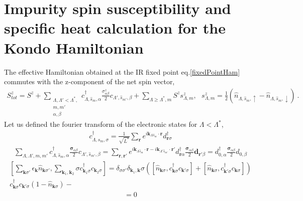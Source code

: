 \documentclass[aps,prx,preprint,groupedaddress]{revtex4-2}
\begin{document}
\section{Impurity spin susceptibility and specific heat calculation for the Kondo Hamiltonian}
The effective Hamiltonian obtained at the IR fixed point eq.\eqref{fixedPointHam} commutes with the z-component of the net spin vector,
\begin{eqnarray}
S^{z}_{tot}=S^{z}+\sum_{\substack{\Lambda,\Lambda'<\Lambda^{*},\\ m,m'\\\alpha,\beta}}c^{\dagger}_{\Lambda,\hat{s}_{m},\alpha}\frac{\sigma_{\alpha\beta}^{z}}{2}c_{\Lambda',\hat{s}_{m'},\beta}+\sum_{\Lambda\geq \Lambda^{*},m}S^{z}s^{z}_{\Lambda,m},~~~ s^{z}_{\Lambda,m}=\frac{1}{2}\left(\hat{n}_{\Lambda,\hat{s}_{m},\uparrow}-\hat{n}_{\Lambda,\hat{s}_{m},\downarrow}\right)~.~~~
\end{eqnarray}
Let us defined the fourier transform of the electronic states for $\Lambda<\Lambda^{*}$,
\begin{eqnarray}
c^{\dagger}_{\Lambda,\hat{s}_{m},\sigma}=\frac{1}{\sqrt{L^{*}}}\sum_{\mathbf{r}}e^{i\mathbf{k}_{\Lambda\hat{s}_{m}}\cdot\mathbf{r}}d^{\dagger}_{\mathbf{r}\sigma}
\end{eqnarray}
\begin{eqnarray}
\sum_{\Lambda,\Lambda',m,m'} c^{\dagger}_{\Lambda,\hat{s}_{m},\alpha}\frac{\boldsymbol{\sigma}_{\alpha\beta}}{2}c_{\Lambda',\hat{s}_{m'},\beta}=\sum_{\mathbf{r},\mathbf{r}'}e^{i\mathbf{k}_{\Lambda\hat{s}_{m}}\cdot\mathbf{r}-i\mathbf{k}_{\Lambda'\hat{s}_{m'}}\cdot\mathbf{r}'}d^{\dagger}_{\mathbf{r}\alpha}\frac{\boldsymbol{\sigma}_{\alpha\beta}}{2}\mathbf{d}_{\mathbf{r}'\beta}=d^{\dagger}_{0,\alpha}\frac{\boldsymbol{\sigma}_{\alpha\beta}}{2}d_{0,\beta}
\end{eqnarray}
\begin{eqnarray}
\left[\sum_{\mathbf{k}\sigma'}\epsilon_{\mathbf{k}}\hat{n}_{\mathbf{k}\sigma'},\sum_{\mathbf{k}_{1},\mathbf{k}_{2}}\sigma c^{\dagger}_{\mathbf{k}_{1}\sigma}c_{\mathbf{k}_{2}\sigma}\right]=\delta_{\sigma\sigma'}\delta_{\mathbf{k}_{1},\mathbf{k}}\sigma(\left[\hat{n}_{\mathbf{k}\sigma},c^{\dagger}_{\mathbf{k}\sigma}c_{\mathbf{k}'\sigma}\right]+\left[\hat{n}_{\mathbf{k}\sigma},c^{\dagger}_{\mathbf{k}'\sigma}c_{\mathbf{k}\sigma}\right])\nonumber\\
c^{\dagger}_{\mathbf{k}\sigma}c_{\mathbf{k}'\sigma}(1-\hat{n}_{\mathbf{k}\sigma})-
\end{eqnarray}
\begin{eqnarray}
[H^{*},S^{z}_{tot}]=0
\end{eqnarray}
\end{document}
